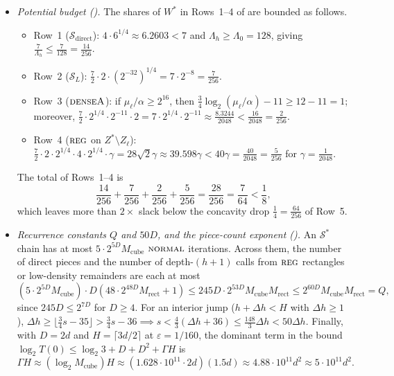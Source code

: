 \documentclass[11pt]{article}
\theoremstyle{definition}
\newcommand{\tagreg}{\textnormal{\textsc{reg}}}
\newcommand{\tagdenseA}{\textnormal{\textsc{denseA}}}
\newcommand{\tagnormal}{\textnormal{\textsc{normal}}}
\begin{document}
\begin{itemize}[leftmargin=*]
    \item \emph{Potential budget ().} The shares of $W^*$ in Rows~1--4 of  are bounded as follows.
    \begin{itemize}[leftmargin=*]
        \item Row~1 ($\mathcal{S}_{\text{direct}}$): $4 \cdot 6^{1/4} \approx 6.2603 < 7$ and $\Lambda_h \ge \Lambda_0 = 128$, giving $\frac{7}{\Lambda_h} \le \frac{7}{128} = \frac{14}{256}$.
        \item Row~2 ($\mathcal{S}_L$): $\frac{7}{2} \cdot 2 \cdot (2^{-32})^{1/4} = 7 \cdot 2^{-8} = \frac{7}{256}$.
        \item Row~3 ($\tagdenseA$): if $\mu_\ell/\alpha \ge 2^{16}$, then $\frac{3}{4}\log_2(\mu_\ell/\alpha) - 11 \ge 12 - 11 = 1$; moreover, $\frac{7}{2} \cdot 2^{1/4} \cdot 2^{-11} \cdot 2 = 7 \cdot 2^{1/4} \cdot 2^{-11} \approx \frac{8.3244}{2048} < \frac{16}{2048} = \frac{2}{256}$.
        \item Row~4 ($\tagreg$ on $Z^* \setminus Z_\ell$): $\frac{7}{2} \cdot 2 \cdot 2^{1/4} \cdot 4 \cdot 2^{1/4} \cdot \gamma = 28\sqrt{2}\gamma \approx 39.598\gamma < 40\gamma = \frac{40}{2048} = \frac{5}{256}$ for $\gamma = \frac{1}{2048}$.
    \end{itemize}
    The total of Rows~1--4 is
    \[
        \frac{14}{256} + \frac{7}{256} + \frac{2}{256} + \frac{5}{256} = \frac{28}{256} = \frac{7}{64} < \frac{1}{8},
    \]
    which leaves more than $2\times$ slack below the concavity drop $\frac{1}{4} = \frac{64}{256}$ of Row~5.
    \item \emph{Recurrence constants $Q$ and $50D$, and the piece-count exponent ().} An $\mathcal{S}^*$ chain has at most $5 \cdot 2^{5D} M_{\text{cube}}$ $\tagnormal$ iterations. Across them, the number of direct pieces and the number of depth-$(h+1)$ calls from $\tagreg$ rectangles or low-density remainders are each at most
    \[
        (5 \cdot 2^{5D} M_{\text{cube}}) \cdot D(48 \cdot 2^{48D} M_{\text{rect}} + 1) \le 245 D \cdot 2^{53D} M_{\text{cube}} M_{\text{rect}} \le 2^{60D} M_{\text{cube}} M_{\text{rect}} = Q,
    \]
    since $245 D \le 2^{7D}$ for $D \ge 4$. For an interior jump ($h + \Delta h < H$ with $\Delta h \ge 1$), $\Delta h \ge \lfloor \frac{3}{4}s - 35 \rfloor > \frac{3}{4}s - 36 \implies s < \frac{4}{3}(\Delta h + 36) \le \frac{148}{3}\Delta h < 50\Delta h$. Finally, with $D = 2d$ and $H = \lceil 3d/2 \rceil$ at $\varepsilon = 1/160$, the dominant term in the bound $\log_2 T(0) \le \log_2 3 + D + D^2 + \Gamma H$ is
    \[
        \Gamma H \approx (\log_2 M_{\text{cube}})H \approx (1.628 \cdot 10^{11} \cdot 2d)(1.5d) \approx 4.88 \cdot 10^{11} d^2 \approx 5 \cdot 10^{11} d^2.
    \]
\end{itemize}
\end{document}
